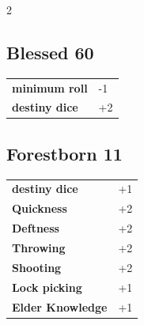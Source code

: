 \begin{multicols}{2}
\begin{tcolorbox}
    \subsection*{Blessed \hfill \small{60 }}
    \tcblower




\begin{tabular}{@{}ll@{}}
    \textbf{minimum roll} & -1\\
    \textbf{destiny dice} & +2\\
\end{tabular}


\end{tcolorbox}

\begin{tcolorbox}
    \subsection*{Forestborn \hfill \small{11 }}
    \tcblower




\begin{tabular}{@{}ll@{}}
    \textbf{destiny dice} & +1\\
    \textbf{Quickness} & +2\\
    \textbf{Deftness} & +2\\
    \textbf{Throwing} & +2\\
    \textbf{Shooting} & +2\\
    \textbf{Lock picking} & +1\\
    \textbf{Elder Knowledge} & +1\\
\end{tabular}


\end{tcolorbox}

\end{multicols}